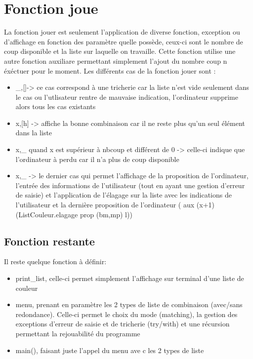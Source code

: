 \documentclass[a4paper,twoside,12pt]{report}
\newcommand{\moncode}[1]{\begin{center}
                        
                        \end{center}}
\begin{document}
\section{Fonction joue}
%
\moncode{mastermind.mli}
%
\moncode{jouer.ml}
%
\par
La fonction jouer est seulement l'application de diverse fonction, exception ou d'affichage en fonction des paramètre quelle possède, ceux-ci sont  le nombre de coup disponible et la liste sur laquelle on travaille. Cette fonction utilise une autre fonction auxiliare permettant simplement l'ajout du nombre coup n éxéctuer pour le moment. Les différents cas de la fonction jouer sont :
\begin{itemize}
\item \_,[]-> ce cas correspond à une tricherie car la liste n'est vide seulement dans le cas ou l'utlisateur rentre de mauvaise indication, l'ordinateur supprime alors tous les cas existants
\item x,[h] -> affiche la bonne combinaison car il ne reste plus qu'un seul élément dans la liste
\item x,\_ quand x est supérieur à nbcoup et différent de 0 -> celle-ci indique que l'ordinateur à perdu car il n'a plus de coup disponible
\item x,\_ -> le dernier cas qui permet l'affichage de la proposition de l'ordinateur, l'entrée des informations de l'utilisateur (tout en ayant une gestion d'erreur de saisie) et l'application de l'élagage sur la liste avec les indications de l'utilisateur et la dernière proposition de l'ordinateur ( aux (x+1) (ListCouleur.elagage prop (bm,mp) l))
\end{itemize}
\subsection{Fonction restante}
\par
Il reste quelque fonction à définir:
\begin{itemize}	
\item print\_list, celle-ci permet simplement l'affichage sur terminal d'une liste de couleur
\item menu, prenant en paramètre les 2 types de liste de combinaison (avec/sans redondance). Celle-ci permet le choix du mode (matching), la gestion des exceptions d'erreur de saisie et de tricherie (try/with) et une récursion permettant la rejouabilité du programme
\item main(), faisant juste l'appel du menu ave c les 2 types de liste 
\end{itemize}
\end{document}
